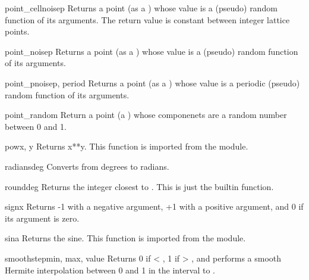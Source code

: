 \begin{funcdesc}{point_cellnoise}{p}
Returns a point (as a ) whose value is a (pseudo) random
function of its arguments. The return value is constant between
integer lattice points.
\end{funcdesc}

\begin{funcdesc}{point_noise}{p}
Returns a point (as a ) whose value is a (pseudo) random function
of its arguments.
\end{funcdesc}

\begin{funcdesc}{point_pnoise}{p, period}
Returns a point (as a ) whose value is a periodic (pseudo) random
function of its arguments.
\end{funcdesc}

\begin{funcdesc}{point_random}{}
Return a point (a ) whose componenets are a random number between
0 and 1.
\end{funcdesc}

\begin{funcdesc}{pow}{x, y}
Returns x**y. This function is imported from the  module.
\end{funcdesc}

\begin{funcdesc}{radians}{deg}
Converts from degrees to radians.
\end{funcdesc}

\begin{funcdesc}{round}{deg}
Returns the integer closest to . This is just the builtin 
 function.
\end{funcdesc}

\begin{funcdesc}{sign}{x}
Returns -1 with a negative argument, +1 with a positive argument, and
0 if its argument is zero.
\end{funcdesc}

\begin{funcdesc}{sin}{a}
Returns the sine. This function is imported from the  module.
\end{funcdesc}

\begin{funcdesc}{smoothstep}{min, max, value}
Returns 0 if  < , 1 if  > ,
and performs a smooth Hermite interpolation between 0 and 1 in the
interval  to .
\end{funcdesc}

